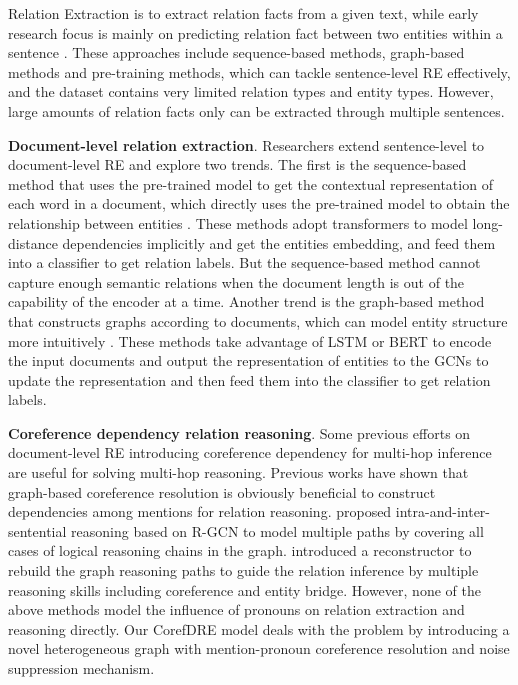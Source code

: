 \documentclass{article}
\begin{document}
Relation Extraction is to extract relation facts from a given text, while early research focus is mainly on predicting relation fact between two entities within a sentence \cite{zeng2015distant,wang2016relation,zhang2017position,zhao2021modeling,liu2021attention,guo2021learning,shang2022pattern}. These approaches include sequence-based methods, graph-based methods and pre-training methods, which can tackle sentence-level RE effectively, and the dataset contains very limited relation types and entity types. However, large amounts of relation facts only can be extracted through multiple sentences. 

\textbf{Document-level relation extraction}.  Researchers extend sentence-level to document-level RE \cite{christopoulou2019connecting,wang2020global,zhang2021document} and explore two trends. The first is the sequence-based method that uses the pre-trained model to get the contextual representation of each word in a document, which directly uses the pre-trained model to obtain the relationship between entities \cite{ye2020coreferential}. These methods adopt transformers to model long-distance dependencies implicitly and get the entities embedding, and feed them into a classifier to get relation labels. But the sequence-based method cannot capture enough semantic relations when the document length is out of the capability of the encoder at a time. Another trend is the graph-based method that constructs graphs according to documents, which can model entity structure more intuitively  \cite{sahu2019inter,zhu2019graph,zeng2020double}. These methods take advantage of LSTM or BERT to encode the input documents and output the representation of entities to the GCNs to update the representation and then feed them into the classifier to get relation labels.

\textbf{Coreference dependency relation reasoning}. Some previous efforts on document-level RE introducing coreference dependency for multi-hop inference are useful for solving multi-hop reasoning. Previous works \cite{zhu2019graph,sahu2019inter,fu2021end} have shown that graph-based coreference resolution is obviously beneficial to construct dependencies among mentions for relation reasoning. \cite{zeng2021sire} proposed intra-and-inter-sentential reasoning based on R-GCN to model multiple paths by covering all cases of logical reasoning chains in the graph. \cite{xu2021discriminative} introduced a reconstructor to rebuild the graph reasoning paths to guide the relation inference by multiple reasoning skills including coreference and entity bridge. However, none of the above methods model the influence of pronouns on relation extraction and reasoning directly. Our CorefDRE model deals with the problem by introducing a novel heterogeneous graph with mention-pronoun coreference resolution and noise suppression mechanism.  
\end{document}
